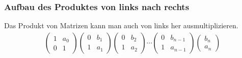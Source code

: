 \subsubsection {Aufbau des Produktes von links nach rechts}
Das Produkt von Matrizen kann man auch von links her ausmultiplizieren.
\begin{align*}
		\begin{pmatrix}
			1& a_0\\
			0& 1
		\end{pmatrix}
		\begin{pmatrix}
			0& b_1\\
			1& a_1
		\end{pmatrix}
		\begin{pmatrix}
			0& b_2\\
			1& a_2
		\end{pmatrix}
		\cdots
		\begin{pmatrix}
			0& b_{n-1}\\
			1& a_{n-1}
		\end{pmatrix}
		\begin{pmatrix}
			b_n\\
			a_n
		\end{pmatrix}
\end{align*}
